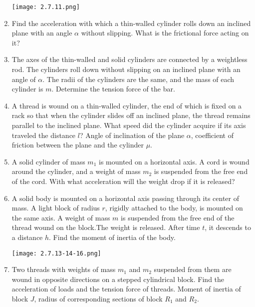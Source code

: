 \documentclass{article}
\begin{document}
\begin{enumerate}[label=2.7.\arabic*]
\begin{center}
    \texttt{[image: 2.7.11.png]}
\end{center}

\item Find the acceleration with which a thin-walled cylinder rolls down an inclined plane with an angle $\alpha$ without slipping. What is the frictional force acting on it?

\item The axes of the thin-walled and solid cylinders are connected by a weightless rod. The cylinders roll down without slipping on an inclined plane with an angle of $\alpha$. The radii of the cylinders are the same, and the mass of each cylinder is $m$. Determine the tension force of the bar.

\item A thread is wound on a thin-walled cylinder, the end of which is fixed on a rack so that when the cylinder slides off an inclined plane, the thread remains parallel to the inclined plane. What speed did the cylinder acquire if its axis traveled the distance $l$? Angle of inclination of the plane $\alpha$, coefficient of friction between the plane and the cylinder $\mu$.

\item A solid cylinder of mass $m_1$ is mounted on a horizontal axis. A cord is wound around the cylinder, and a weight of mass $m_2$ is suspended from the free end of the cord. With what acceleration will the weight drop if it is released?

\item A solid body is mounted on a horizontal axis passing through its center of mass. A light block of radius $r$, rigidly attached to the body, is mounted on the same axis. A weight of mass $m$ is suspended from the free end of the thread wound on the block.The weight is released. After time $t$, it descends to a distance $h$. Find the moment of inertia of the body.

\begin{center}
    \texttt{[image: 2.7.13-14-16.png]}
\end{center}

\item Two threads with weights of mass $m_1$ and $m_2$ suspended from them are wound in opposite directions on a stepped cylindrical block. Find the acceleration of loads and the tension force of threads. Moment of inertia of block $J$, radius of corresponding sections of block $R_1$ and $R_2$.


\end{enumerate}
\end{document}
